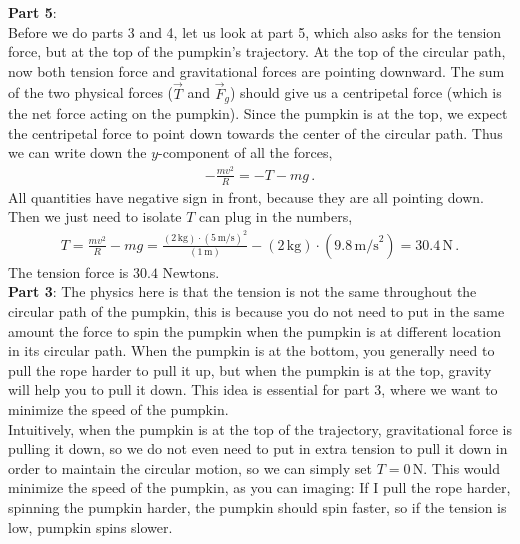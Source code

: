 \documentclass[11pt]{article}
\begin{document}
\noindent\textbf{Part 5}:\\
Before we do parts 3 and 4, let us look at part 5, which also asks for the tension force, but at the top of the pumpkin's trajectory. At the top of the circular path, now both tension force and gravitational forces are pointing downward. The sum of the two physical forces ($\vec{T}$ and $\vec{F}_g$) should give us a centripetal force (which is the net force acting on the pumpkin). Since the pumpkin is at the top, we expect the centripetal force to point down towards the center of the circular path. Thus we can write down the $y$-component of all the forces, 
\begin{align*}
-\frac{mv^2}{R} = -T- mg\,. \tag{*}
\end{align*}
All quantities have negative sign in front, because they are all pointing down. Then we just need to isolate $T$ can plug in the numbers,  
\begin{align*}
T = \frac{mv^2}{R} - mg = \frac{(2\,\text{kg})\cdot (5\,\text{m/s})^2}{(1\,\text{m})} - (2\,\text{kg})\cdot(9.8\,\text{m/s}^2) = 30.4\,\text{N}\,.
\end{align*}
The tension force is $30.4$ Newtons.\\

\noindent\textbf{Part 3}:
The physics here is that the tension is not the same throughout the circular path of the pumpkin, this is because you do not need to put in the same amount the force to spin the pumpkin when the pumpkin is at different location in its circular path. When the pumpkin is at the bottom, you generally need to pull the rope harder to pull it up, but when the pumpkin is at the top, gravity will help you to pull it down. This idea is essential for part 3, where we want to minimize the speed of the pumpkin. \\

Intuitively, when the pumpkin is at the top of the trajectory, gravitational force is pulling it down, so we do not even need to put in extra tension to pull it down in order to maintain the circular motion, so we can simply set $T = 0\,$N. This would minimize the speed of the pumpkin, as you can imaging: If I pull the rope harder, spinning the pumpkin harder, the pumpkin should spin faster, so if the tension is low, pumpkin spins slower.\\
\end{document}
